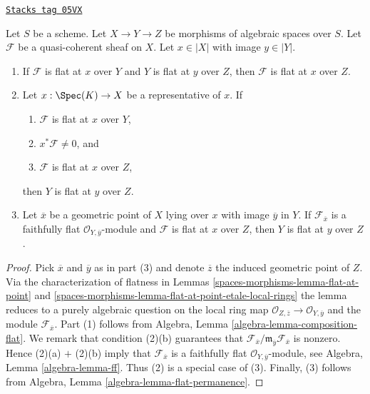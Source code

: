 \begin{lemma}
\label{spaces-morphisms-lemma-composition-module-flat}
\href{https://stacks.math.columbia.edu/tag/05VX}{\texttt{Stacks tag 05VX}}

Let $S$ be a scheme. Let $X \to Y \to Z$ be morphisms of algebraic spaces
over $S$. Let $\mathcal{F}$ be a quasi-coherent sheaf on $X$.
Let $x \in |X|$ with image $y \in |Y|$.
\begin{enumerate}
\item If $\mathcal{F}$ is flat at $x$ over $Y$ and
$Y$ is flat at $y$ over $Z$, then $\mathcal{F}$ is flat at
$x$ over $Z$.
\item Let $x : \Spec(K) \to X$ be a representative of $x$. If
\begin{enumerate}
\item $\mathcal{F}$ is flat at $x$ over $Y$,
\item $x^*\mathcal{F} \not = 0$, and
\item $\mathcal{F}$ is flat at $x$ over $Z$,
\end{enumerate}
then $Y$ is flat at $y$ over $Z$.
\item Let $\overline{x}$ be a geometric point of $X$ lying over $x$
with image $\overline{y}$ in $Y$. If $\mathcal{F}_{\overline{x}}$ is a
faithfully flat $\mathcal{O}_{Y, \overline{y}}$-module and
$\mathcal{F}$ is flat at $x$ over $Z$, then
$Y$ is flat at $y$ over $Z$.
\end{enumerate}
\end{lemma}

\begin{proof}
Pick $\overline{x}$ and $\overline{y}$ as in part (3) and denote
$\overline{z}$ the induced geometric point of $Z$. Via the
characterization of flatness in
Lemmas \ref{spaces-morphisms-lemma-flat-at-point} and
\ref{spaces-morphisms-lemma-flat-at-point-etale-local-rings}
the lemma reduces to a purely algebraic question on the local
ring map $\mathcal{O}_{Z, \overline{z}} \to \mathcal{O}_{Y, \overline{y}}$
and the module $\mathcal{F}_{\overline{x}}$.
Part (1) follows from
Algebra, Lemma \ref{algebra-lemma-composition-flat}.
We remark that condition (2)(b) guarantees that
$\mathcal{F}_{\overline{x}}/
\mathfrak m_{\overline{y}} \mathcal{F}_{\overline{x}}$
is nonzero. Hence (2)(a) $+$ (2)(b) imply that $\mathcal{F}_{\overline{x}}$
is a faithfully flat $\mathcal{O}_{Y, \overline{y}}$-module, see
Algebra, Lemma \ref{algebra-lemma-ff}.
Thus (2) is a special case of (3).
Finally, (3) follows from
Algebra, Lemma \ref{algebra-lemma-flat-permanence}.
\end{proof}

